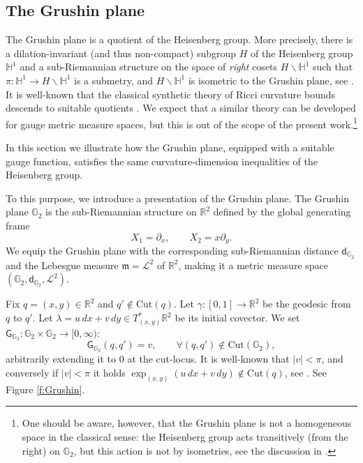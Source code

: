 \documentclass[11pt,a4paper]{article}
\theoremstyle{plain}
\theoremstyle{definition}
\theoremstyle{remark}
\numberwithin{equation}{section}
\newcommand{\R}{\mathbb{R}} %
\newcommand{\Cut}{\mathrm{Cut}}
\newcommand{\mm}{\mathfrak m}
\newcommand{\sfd}{\mathsf d}
\newcommand{\sfG}{\mathsf G}
\begin{document}
\subsection{The Grushin plane}\label{sec:Grushin}

The Grushin plane is a quotient of the Heisenberg group. More precisely, there is a dilation-invariant (and thus non-compact) subgroup $H$ of the Heisenberg group $\mathbb{H}^1$ and a sub-Riemannian structure on the space of \emph{right} cosets $H\backslash \mathbb{H}^1$ such that $\pi : \mathbb{H}^1 \to H\backslash \mathbb{H}^1$ is a submetry, and $H\backslash \mathbb{H}^1$ is isometric to the Grushin plane, see \cite[Sec.\ 5]{Bellaiche}. It is well-known that the classical synthetic theory of Ricci curvature bounds descends to suitable quotients \cite{GKMS-quotients}. We expect that a similar theory can be developed for gauge metric measure spaces, but this is out of the scope of the present work.\footnote{One should be aware, however, that the Grushin plane is not a homogeneous space in the classical sense: the Heisenberg group acts transitively (from the right) on $\mathbb{G}_2$, but this action is not by isometries, see the discussion in \cite[p.\ 53]{Bellaiche}.}

In this section we illustrate how the Grushin plane, equipped with a suitable gauge function, satisfies the same curvature-dimension inequalities of the Heisenberg group.

To this purpose, we introduce a presentation of the Grushin plane. The Grushin plane $\mathbb{G}_2$ is the sub-Riemannian structure on $\R^2$ defined by the global generating frame
\begin{equation}
X_1 = \partial_x, \qquad X_2 = x \partial_y.
\end{equation}
We equip the Grushin plane with the corresponding sub-Riemannian distance $\sfd_{\mathbb{G}_2}$ and the Lebesgue measure $\mm=\mathscr{L}^2$ of $\R^2$, making it a metric measure space $(\mathbb{G}_2,\sfd_{\mathbb{G}_2},\mathcal{L}^2)$.


Fix $q = (x,y)\in \R^2$ and $q'\notin \Cut(q)$. Let $\gamma:[0,1]\to \R^2$ be the geodesic from $q$ to $q'$. Let $\lambda = u\, dx+v\, dy \in T^*_{(x,y)}\R^2$ be its initial covector. We set $\sfG_{\mathbb{G}_2}:\mathbb{G}_2\times \mathbb{G}_2 \to [0,\infty)$:
\begin{equation}\label{eq:GGrushin}
\sfG_{\mathbb{G}_2}(q,q') = v,\qquad \forall (q,q')\notin \Cut(\mathbb{G}_2),
\end{equation}
arbitrarily extending it to $0$ at the cut-locus. It is well-known that $|v|<\pi$, and conversely if $|v|<\pi$ it holds $\exp_{(x,y)}(u\, dx+v\, dy) \notin \Cut(q)$, see \cite[Ch.\ 13]{nostrolibro}. See Figure \ref{f:Grushin}.
\end{document}
